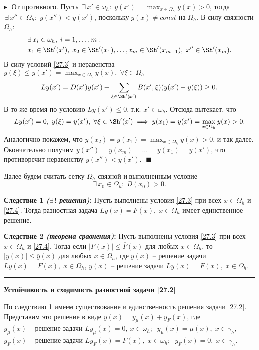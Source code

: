 $\blacktriangleright\;$ От противного. Пусть $\,\exists  \, x'\in \omega_h: \; y(x') = \max_{x\in\Omega_h} y(x) > 0$, тогда $\,\exists\, x''\in\Omega_h:\; y(x'') < y(x')$, поскольку $y(x) \ne const$ на $\Omega_h$. В силу связности $\Omega_h$:
\begin{align*}
    &\exists \, x_i \in \omega_h, \; i = 1, \ldots, m:\\
    & x_1 \in \Sh'(x'), \; x_2 \in \Sh'(x_1), \ldots, x_m \in \Sh'(x_{m-1}), \; x'' \in \Sh'(x_m).
\end{align*}
В силу условий \eqref{27.3} и неравенства $y(\xi) \leq y(x') = \max_{x\in\Omega_h} y(x), \; \forall \xi \in \Omega_h$
$$
L y(x') = D(x') y(x') +  \sum_{\xi \in \Sh'(x')} B(x', \xi) (y(x') - y(\xi)) \geq 0.
$$
В то же время по условию $Ly(x') \leq 0$, т.к. $x' \in \omega_h$. Отсюда вытекает, что 
$$
L y(x') = 0, \; y(\xi) = y(x'), \;\forall \xi \in \Sh'(x') \implies y(x_1) = y(x') = \max_{x\in\Omega_h} y(x) > 0.
$$
Аналогично покажем, что $y(x_2) = y(x_1) = \max_{x\in\Omega_h} y(x) > 0$, и так далее. Окончательно получим $y(x'') = y(x_m) = \ldots =y(x_1) = y(x')$, что противоречит неравенству $y(x'') < y(x')$. $\;\blacksquare$

Далее будем считать сетку $\Omega_h$ связной и выполненным условие
\begin{equation}
    \label{27.4}
    \exists\, x_0 \in \Omega_h:\; D(x_0) > 0.
\end{equation}

\textbf{Следствие 1 \textit{($\exists\,!$ решения)}:}\; Пусть выполнены условия \eqref{27.3} при всех $x \in \Omega_h$ и \eqref{27.4}. Тогда разностная задача $L y(x) = F(x), \; x\in \Omega_h$ имеет единственное решение.

\textbf{Следствие 2 \textit{(теорема сравнения)}:}\; Пусть выполнены условия \eqref{27.3} при всех $x \in \Omega_h$ и \eqref{27.4}. Тогда если $|F(x)| \leq \overline{F}(x)$ для любых $x \in \Omega_h$, то $|y(x)| \leq \overline{y}(x)$ для любых $x \in \Omega_h$, где $y(x)$ -- решение задачи $L y(x) = F(x), \; x\in \Omega_h$, $\overline{y}(x)$ -- решение задачи $L\overline{y}(x) = \overline{F}(x),\; x\in\Omega_h$.

\rule{275pt}{0.5pt} 

\textbf{Устойчивость и сходимость разностной задачи \eqref{27.2}}

По следствию 1 имеем существование и единственность решения задачи \eqref{27.2}. Представим это решение в виде $y(x) = y_\mu(x) + y_F(x)$, где 
\\$y_\mu(x)$ -- решение задачи $L y_\mu(x) = 0, \;x \in \omega_h; \;\; y_\mu(x) = \mu(x),\;x\in\gamma_h$, 
\\$y_F(x)$ -- решение задачи $L y_F(x) = F(x), \; x\in \omega_h;\;\;y_F(x) = 0, \; x\in\gamma_h$.

